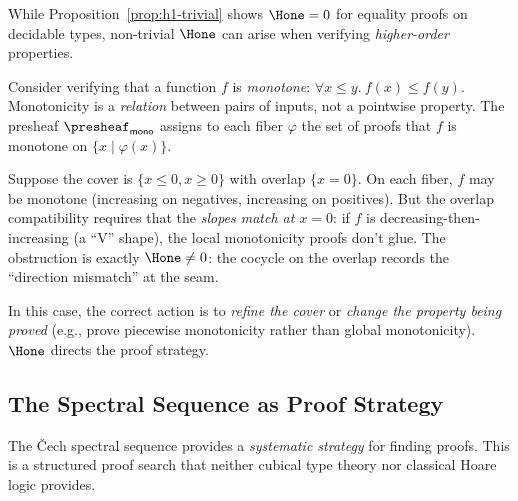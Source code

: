 \begin{example}
\label{ex:nontrivial-h1}
While Proposition~\ref{prop:h1-trivial} shows $\Hone = 0$ for
equality proofs on decidable types, non-trivial $\Hone$ can
arise when verifying \emph{higher-order} properties.

Consider verifying that a function $f$ is \emph{monotone}:
$\forall x \leq y.\ f(x) \leq f(y)$.  Monotonicity is a
\emph{relation} between pairs of inputs, not a pointwise
property.  The presheaf $\presheaf_\mathsf{mono}$ assigns
to each fiber $\varphi$ the set of proofs that $f$ is monotone
on $\{x \mid \varphi(x)\}$.

Suppose the cover is $\{x \leq 0, x \geq 0\}$ with overlap
$\{x = 0\}$.  On each fiber, $f$ may be monotone (increasing on
negatives, increasing on positives).  But the overlap compatibility
requires that the \emph{slopes match at $x = 0$}: if $f$ is
decreasing-then-increasing (a ``V'' shape), the local monotonicity
proofs don't glue.  The obstruction is exactly $\Hone \neq 0$:
the cocycle on the overlap records the ``direction mismatch'' at
the seam.

In this case, the correct action is to \emph{refine the cover}
or \emph{change the property being proved} (e.g., prove piecewise
monotonicity rather than global monotonicity).  $\Hone$ directs
the proof strategy.
\end{example}


\subsection{The Spectral Sequence as Proof Strategy}
\label{sec:spectral}

The \v{C}ech spectral sequence provides a \emph{systematic strategy}
for finding proofs.  This is a structured proof search that neither
cubical type theory nor classical Hoare logic provides.

